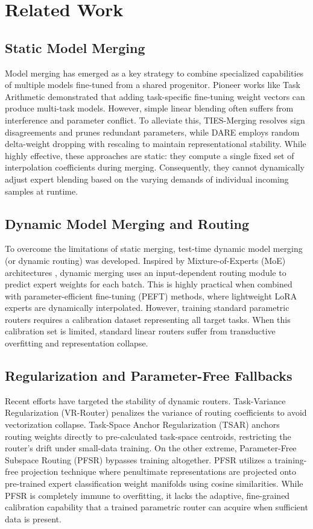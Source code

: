 \section{Related Work}
\label{sec:related}

\subsection{Static Model Merging}
Model merging has emerged as a key strategy to combine specialized capabilities of multiple models fine-tuned from a shared progenitor. Pioneer works like Task Arithmetic \cite{Wortsman2022} demonstrated that adding task-specific fine-tuning weight vectors can produce multi-task models. However, simple linear blending often suffers from interference and parameter conflict. To alleviate this, TIES-Merging \cite{Yadav2023} resolves sign disagreements and prunes redundant parameters, while DARE \cite{Yu2023} employs random delta-weight dropping with rescaling to maintain representational stability. While highly effective, these approaches are static: they compute a single fixed set of interpolation coefficients during merging. Consequently, they cannot dynamically adjust expert blending based on the varying demands of individual incoming samples at runtime.

\subsection{Dynamic Model Merging and Routing}
To overcome the limitations of static merging, test-time dynamic model merging (or dynamic routing) was developed. Inspired by Mixture-of-Experts (MoE) architectures \cite{Shazeer2017, DudaHart2nd}, dynamic merging uses an input-dependent routing module to predict expert weights for each batch. This is highly practical when combined with parameter-efficient fine-tuning (PEFT) methods, where lightweight LoRA experts are dynamically interpolated. However, training standard parametric routers requires a calibration dataset representing all target tasks. When this calibration set is limited, standard linear routers suffer from transductive overfitting and representation collapse.

\subsection{Regularization and Parameter-Free Fallbacks}
Recent efforts have targeted the stability of dynamic routers. Task-Variance Regularization (VR-Router) penalizes the variance of routing coefficients to avoid vectorization collapse. Task-Space Anchor Regularization (TSAR) anchors routing weights directly to pre-calculated task-space centroids, restricting the router's drift under small-data training. On the other extreme, Parameter-Free Subspace Routing (PFSR) bypasses training altogether. PFSR utilizes a training-free projection technique where penultimate representations are projected onto pre-trained expert classification weight manifolds using cosine similarities. While PFSR is completely immune to overfitting, it lacks the adaptive, fine-grained calibration capability that a trained parametric router can acquire when sufficient data is present.

